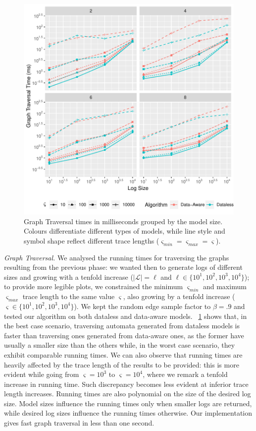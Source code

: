 \documentclass[acmengage]{acmart}
\begin{document}
\begin{figure}[!t]
\centering
\includegraphics[width=.9\linewidth]{fig/TraversingTimesSolo}
\caption{Graph Traversal times in milliseconds grouped by the model size. Colours differentiate different types of models, while line style and symbol shape reflect different trace lengths ($\varsigma_\textit{min}=\varsigma_\textit{max}=\varsigma$).}\label{traversetimesolo}
\end{figure}
\textit{Graph Traversal.} We analysed the running times for traversing the graphs resulting from the previous phase: we wanted then to generate logs of different sizes and growing with a tenfold increase ($|\mathcal{L}|=\ell$ and $\ell\in\{10^1,10^2,10^3,10^4\}$); to provide more legible plots, we constrained the minimum $\varsigma_\textit{min}$ and maximum $\varsigma_\textit{max}$ trace length to the same value $\varsigma$, also growing by a tenfold increase ($\varsigma\in\{10^1,10^2,10^3,10^4\}$). We kept the random edge sample factor to $\beta=.9$ and tested our algorithm on both dataless and data-aware models. \figurename~\ref{traversetimesolo} shows that,  in the best case scenario, traversing automata generated from dataless models is faster than traversing ones generated from data-aware ones, as the former have usually a smaller size than the others while, in the worst case scenario, they exhibit comparable running times. We can also observe that running times are heavily affected by the trace length of the results to be provided: this is more evident while going from $\varsigma=10^3$ to $\varsigma=10^4$, where we remark a tenfold increase in running time. Such discrepancy becomes less evident at inferior trace length increases. Running times are also polynomial on the size of the desired log size. Model sizes influence the running times only when smaller logs are returned, while desired log sizes influence the running times otherwise. Our implementation gives fast graph traversal in less than one second. 
 
\end{document}
